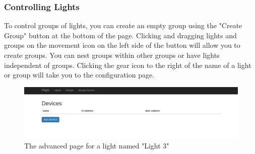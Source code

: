 \subsubsection{Controlling Lights}
To control groups of lights, you can create an empty group using the "Create Group" button at the bottom of the page. Clicking and dragging lights and groups on the movement icon on the left side of the button will allow you to create groups. You can nest groups within other groups or have lights independent of groups. Clicking the gear icon to the right of the name of a light or group will take you to the configuration page.\\
\begin{figure}[h!]
   \includegraphics[width=1.0\textwidth]{devices.png}
   \caption{The advanced page for a light named "Light 3"}
\end{figure}
